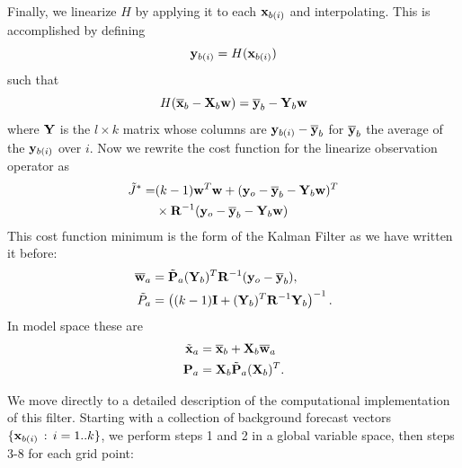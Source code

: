 Finally, we linearize $H$ by applying it to each $\mathbf{x}_{b(i)}$ and interpolating.
This is accomplished by defining
\begin{equation} \mathbf{y} _{b(i)} = H( \mathbf{x}_{b(i)}) \end{equation}
such that 
\begin{equation} H(\overline{\mathbf{x}}_b - \mathbf{X}_b \mathbf{w}) = \overline{\mathbf{y}}_b - \mathbf{Y} _b \mathbf{w} \end{equation}
where $\mathbf{Y}$ is the $l\times k$ matrix whose columns are $\mathbf{y}_{b(i)} - \overline{\mathbf{y}}_b$ for $\overline{\mathbf{y}}_b$ the average of the $\mathbf{y}_{b(i)}$ over $i$.
Now we rewrite the cost function for the linearize observation operator as
\begin{align*} \tilde{J}^* = &(k-1)\mathbf{w}^T \mathbf{w} + (\mathbf{y} _o -\overline{\mathbf{y}} _b - \mathbf{Y} _b \mathbf{w} )^T\\
&\times\mathbf{R}^{-1} (\mathbf{y} _o -\overline{\mathbf{y}} _b - \mathbf{Y} _b \mathbf{w} ) \end{align*}
This cost function minimum is the form of the Kalman Filter as we have written it before:
\begin{align*} \overline{\mathbf{w}}_a &= \tilde{\mathbf{P}}_a (\mathbf{Y} _b )^T \mathbf{R} ^{-1} (\mathbf{y}_o - \overline{\mathbf{y}}_b),\\
\tilde{P}_a &= \left( (k-1)\mathbf{I}+(\mathbf{Y}_b)^T\mathbf{R}^{-1}\mathbf{Y}_b\right ) ^{-1} .\end{align*}
In model space these are
\begin{align*} \tilde{\mathbf{x}}_a &= \overline{\mathbf{x}} _b + \mathbf{X} _b \overline{\mathbf{w}}_a \\
\mathbf{P} _a &= \mathbf{X} _b \tilde{\mathbf{P}}_a (\mathbf{X} _b)^T . \end{align*}

We move directly to a detailed description of the computational implementation of this filter.
Starting with a collection of background forecast vectors $\{ \mathbf{x}_{b(i)} \,:\,i=1..k \}$, we perform steps 1 and 2 in a global variable space, then steps 3-8 for each grid point:

